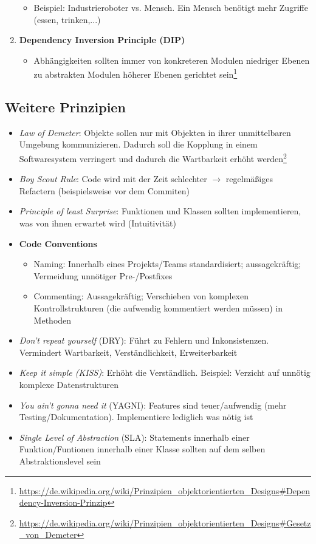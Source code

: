 \begin{enumerate}
\begin{itemize}
		\item Beispiel: Industrieroboter vs. Mensch. Ein Mensch benötigt mehr Zugriffe (essen, trinken,...)
	\end{itemize}
	\item \textbf{Dependency Inversion Principle (DIP)}
	\begin{itemize}
		\item Abhängigkeiten sollten immer von konkreteren Modulen niedriger Ebenen zu abstrakten Modulen höherer Ebenen gerichtet sein\footnote{\url{https://de.wikipedia.org/wiki/Prinzipien_objektorientierten_Designs\#Dependency-Inversion-Prinzip}}
	\end{itemize}
\end{enumerate}


\subsection{Weitere Prinzipien}
\begin{itemize}
	\item \textit{Law of Demeter}: Objekte sollen nur mit Objekten in ihrer unmittelbaren Umgebung kommunizieren. Dadurch soll die Kopplung in einem Softwaresystem verringert und dadurch die Wartbarkeit erhöht werden\footnote{\url{https://de.wikipedia.org/wiki/Prinzipien_objektorientierten_Designs\#Gesetz_von_Demeter}}
	\item \textit{Boy Scout Rule}: Code wird mit der Zeit schlechter \(\rightarrow\) regelmäßiges Refactern (beispielsweise vor dem Commiten)
	\item \textit{Principle of least Surprise}: Funktionen und Klassen sollten implementieren, was von ihnen erwartet wird (Intuitivität)
	\item \textbf{Code Conventions}
	\begin{itemize}
		\item Naming: Innerhalb eines Projekts/Teams standardisiert; aussagekräftig; Vermeidung unnötiger Pre-/Postfixes
		\item Commenting: Aussagekräftig; Verschieben von komplexen Kontrollstrukturen (die aufwendig kommentiert werden müssen) in Methoden
	\end{itemize}
	\item \textit{Don't repeat yourself} (DRY): Führt zu Fehlern und Inkonsistenzen. Vermindert Wartbarkeit, Verständlichkeit, Erweiterbarkeit
	\item \textit{Keep it simple (KISS)}: Erhöht die Verständlich. Beispiel: Verzicht auf unnötig komplexe Datenstrukturen
	\item \textit{You ain't gonna need it} (YAGNI): Features sind teuer/aufwendig (mehr Testing/Dokumentation). Implementiere lediglich was nötig ist
	\item \textit{Single Level of Abstraction} (SLA): Statements innerhalb einer Funktion/Funtionen innerhalb einer Klasse sollten auf dem selben Abstraktionslevel sein
\end{itemize}


